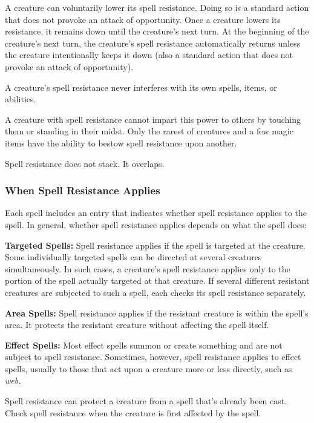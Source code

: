 \documentclass{article}
\begin{document}
A creature can voluntarily lower its spell resistance. Doing so is a standard action 
that does not provoke an attack of opportunity. Once a creature lowers its resistance, 
it remains down until the creature's next turn. At the beginning of the creature's 
next turn, the creature's spell resistance automatically returns unless the creature 
intentionally keeps it down (also a standard action that does not provoke an attack 
of opportunity).

A creature's spell resistance never interferes with its own spells, items, or abilities.

A creature with spell resistance cannot impart this power to others by touching 
them or standing in their midst. Only the rarest of creatures and a few magic items 
have the ability to bestow spell resistance upon another.

Spell resistance does not stack. It overlaps. 

\subsubsection*{\textbf{When Spell Resistance Applies}}

Each spell includes an entry that indicates whether spell resistance applies to 
the spell. In general, whether spell resistance applies depends on what the spell 
does:

\textbf{Targeted Spells:} Spell resistance applies if the spell is targeted at 
the creature. Some individually targeted spells can be directed at several creatures 
simultaneously. In such cases, a creature's spell resistance applies only to the 
portion of the spell actually targeted at that creature. If several different resistant 
creatures are subjected to such a spell, each checks its spell resistance separately.

\textbf{Area Spells:} Spell resistance applies if the resistant creature is within 
the spell's area. It protects the resistant creature without affecting the spell 
itself.

\textbf{Effect Spells:} Most effect spells summon or create something and are not 
subject to spell resistance. Sometimes, however, spell resistance applies to effect 
spells, usually to those that act upon a creature more or less directly, such as 
\textit{web.}

Spell resistance can protect a creature from a spell that's already been cast. 
Check spell resistance when the creature is first affected by the spell.
\end{document}
